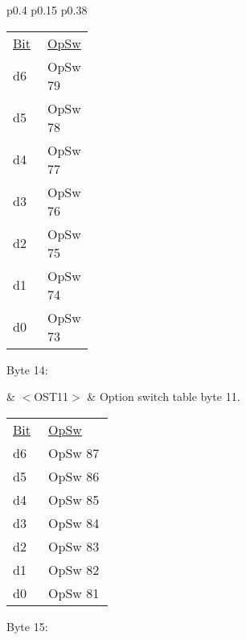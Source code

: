 \begin{tabular}{p{0.4\linewidth} p{0.15\linewidth} p{0.38\linewidth}} 

\begin{tabular}{|p{0.3cm}|p{0.3cm}|p{0.3cm}|p{0.3cm}|p{0.3cm}|p{0.3cm}|p{0.3cm}|p{0.3cm}|}
\hline
0 & d6 & d5 & d4 & d3 & d2 & d1 & d0\\
\hline
\end{tabular}
& $<$OST10$>$ & Option switch table byte 10.\\
\end{tabular}

\begin{tabular}{p{0.05\linewidth} p{0.2\linewidth} } 
\underline{Bit} & \underline{OpSw} \\
d6 & OpSw 79\\
d5 & OpSw 78\\
d4 & OpSw 77\\
d3 & OpSw 76\\
d2 & OpSw 75\\
d1 & OpSw 74\\
d0 & OpSw 73\\
\end{tabular}

Byte 14:

& $<$OST11$>$ & Option switch table byte 11.\\
\end{tabular}

\begin{tabular}{p{0.05\linewidth} p{0.2\linewidth} } 
\underline{Bit} & \underline{OpSw} \\
d6 & OpSw 87\\
d5 & OpSw 86\\
d4 & OpSw 85\\
d3 & OpSw 84\\
d2 & OpSw 83\\
d1 & OpSw 82\\
d0 & OpSw 81\\
\end{tabular}

Byte 15:

